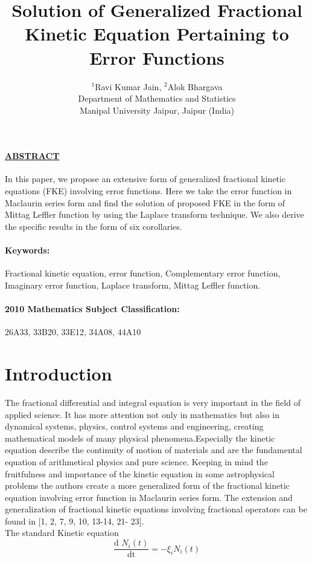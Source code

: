 \documentclass{article}
\title{Solution of Generalized Fractional Kinetic Equation Pertaining to Error Functions}
\author{${^1}$Ravi Kumar Jain, ${^2}$Alok Bhargava\\Department of Mathematics and Statistics\\Manipal University Jaipur, Jaipur (India)}
\date{}
\begin{document}
\maketitle
{}
\newcommand{\frsum}[1][Work]{
    \frac{2}{\sqrt{\pi}}
    $\sum$}
\paragraph{\textbf{\underline{ABSTRACT}}}
In this paper, we propose an extensive form of generalized fractional kinetic equations (FKE) involving error functions. Here we take the error function in Maclaurin series form and find the solution of proposed FKE in the form of Mittag Leffler function by using the Laplace transform technique. We also derive the specific results in the form of six corollaries.

\paragraph{Keywords:}
Fractional kinetic equation, error function, Complementary error function, Imaginary error function, Laplace transform, Mittag Leffler function.

\paragraph{2010 Mathematics Subject Classification:} 26A33, 33B20, 33E12, 34A08, 44A10

\section{Introduction}
The fractional differential and integral equation is very important in the field of applied science. It has more attention not only in mathematics but also in dynamical systems, physics, control systems and engineering, creating mathematical models of many physical phenomena.Especially the kinetic equation describe the continuity of motion of materials and are the fundamental equation of arithmetical physics and pure science. Keeping in mind the fruitfulness and importance of the kinetic equation in some astrophysical problems the authors create a more generalized form of the fractional kinetic equation involving error function in Maclaurin series form. The extension and generalization of fractional kinetic equations involving fractional operators can be found in [1, 2, 7, 9, 10, 13-14, 21- 23].\\
The standard Kinetic equation
\begin{equation}
    \frac{\text{d $N_i(t)$}}{\text{dt}}
    = -\xi _i N_i(t)
\end{equation}
\end{document}
